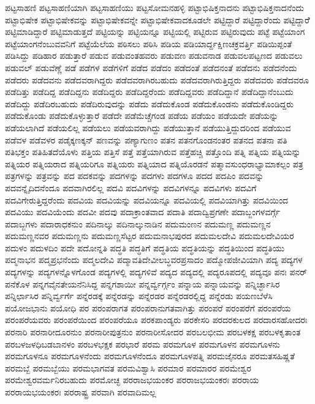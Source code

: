 {ಪಟ್ಟಸಾಹಣಿ
ಪಟ್ಟಸಾಹಣಿಯಾಗಿ
ಪಟ್ಟಸಾಹಣಿಯು
ಪಟ್ಟಸೋಮನಹಳ್ಳಿ
ಪಟ್ಟಾಭಿಷಿಕ್ತನಾದನು
ಪಟ್ಟಾಭಿಷಿಕ್ತನಾದನೆಂದು
ಪಟ್ಟಾಭಿಷೇಕ
ಪಟ್ಟಾಭಿಷೇಕವನ್ನು
ಪಟ್ಟಾಭಿಷೇಕವನ್ನೇ
ಪಟ್ಟಾಭಿಷೇಕವಾದಕೂಡಲೇ
ಪಟ್ಟಿದ್ದಾರೆ
ಪಟ್ಟಿದ್ದಾರೆಂದು
ಪಟ್ಟಿದ್ದಾರೆೆ
ಪಟ್ಟಿಮಾಡಿದ್ದಾರೆ
ಪಟ್ಟಿಮಾಡುತ್ತದೆ
ಪಟ್ಟಿಯನ್ನು
ಪಟ್ಟಿಯನ್ನೂ
ಪಟ್ಟಿಯಲ್ಲಿ
ಪಟ್ಟಿರುವ
ಪಟ್ಟಿರುವುದು
ಪಟ್ಟೆ
ಪಟ್ಟೆಯಾಂಗ
ಪಟ್ಟೆಯಾಂಗನೆಂಬುವವನಿಗೆ
ಪಟ್ಟೆಯೆಲೆಯ
ಪಠಿಸಲು
ಪಠಿಸಿ
ಪಡಿಯ
ಪಡಿಯಾರ್ದ್ದಕ್ಷಿಣಚಕ್ರವರ್ತ್ತಿ
ಪಡಿಯಿಪ್ಪಂತೆ
ಪಡಿಸಿದ್ದು
ಪಡಿಹಾರ
ಪಡುತ್ತಾರೆ
ಪಡುವ
ಪಡುವಂತಹವರು
ಪಡುವಣ
ಪಡುವನಾಡ
ಪಡುವಲಪಟ್ಟಣದ
ಪಡುವಲು
ಪಡುವಲ್
ಪಡುವೆಣ್ಣೆ
ಪಡೆ
ಪಡೆಗಳ
ಪಡೆಗಳಿಗೆ
ಪಡೆದ
ಪಡೆದಂ
ಪಡೆದಂತೆ
ಪಡೆದನಂತೆ
ಪಡೆದನು
ಪಡೆದನೆಂದು
ಪಡೆದರು
ಪಡೆದವನು
ಪಡೆದವರಾಗಿದ್ದರು
ಪಡೆದವರಾಗಿರಬಹುದು
ಪಡೆದವರಾಗಿರುತ್ತಿದ್ದರು
ಪಡೆದವರು
ಪಡೆದವರೂ
ಪಡೆದಿತ್ತು
ಪಡೆದಿದ್ದ
ಪಡೆದಿದ್ದನು
ಪಡೆದಿದ್ದರು
ಪಡೆದಿದ್ದರೆಂದು
ಪಡೆದಿದ್ದವರು
ಪಡೆದಿದ್ದಾನೆ
ಪಡೆದಿದ್ದಾನೆಂಬುದು
ಪಡೆದಿದ್ದು
ಪಡೆದಿರಬಹುದು
ಪಡೆದಿರುವುದನ್ನು
ಪಡೆದು
ಪಡೆದುಕೊಂಡ
ಪಡೆದುಕೊಂಡನು
ಪಡೆದುಕೊಂಡಿದ್ದರು
ಪಡೆದುಕೊಂಡು
ಪಡೆದುಕೊಳ್ಳುತ್ತಾರೆ
ಪಡೆದೇ
ಪಡೆಮೆಚ್ಚೆಗಂಡ
ಪಡೆಯ
ಪಡೆಯಂ
ಪಡೆಯದೇ
ಪಡೆಯನ್ನು
ಪಡೆಯಲಾಗಿದೆ
ಪಡೆಯಲಿಲ್ಲ
ಪಡೆಯಲು
ಪಡೆಯವರಾಗಿದ್ದು
ಪಡೆಯುತ್ತಾನೆ
ಪಡೆಯುತ್ತಿದ್ದುದರಿಂದ
ಪಡೆಯುವ
ಪಡೆವಳ
ಪಡೆವಳರ
ಪಡೈಕ್ಕಣಕ್ಕನ್
ಪಣವನ್ನು
ಪಣ್ಯಾಗುಣಂ
ಪತನ
ಪತನಗೊಂಡನಂತರ
ಪತನದ
ಪತನಾ
ಪತಿ
ಪತಿಭಕ್ತಂ
ಪತಿಹಿತದೆಯೊಳು
ಪತ್ತಿಯ
ಪತ್ತಿಸೆ
ಪತ್ತೆ
ಪತ್ತೆಯಾಗಿರುವ
ಪತ್ತೆಹಚ್ಚಿ
ಪತ್ತೊಂದಿ
ಪತ್ನಿ
ಪತ್ನಿಯ
ಪತ್ನಿಯನ್ನು
ಪತ್ನಿಯರ
ಪತ್ನಿಯರಾದ
ಪತ್ನಿಯರಿಗೂ
ಪತ್ನಿಯರು
ಪತ್ನಿಯಾದ
ಪತ್ನಿಯೊರಡನೆ
ಪತ್ಮಾವಸುಂಧರಾಭ್ಯಾಮಾಕಲ್ಪಂ
ಪತ್ರ
ಪತ್ರಗಳನ್ನು
ಪತ್ರವನ್ನು
ಪದ
ಪದಕವನ್ನು
ಪದಗಳನ್ನು
ಪದಗಳು
ಪದಗಳೂ
ಪದದ
ಪದಪಿಂ
ಪದವನ್ನು
ಪದವನ್ನೈದಿದನೆಂದೂ
ಪದವಾಗಿರಲಿಲ್ಲ
ಪದವಿ
ಪದವಿಗಳನ್ನು
ಪದವಿಗಳನ್ನೂ
ಪದವಿಗಳು
ಪದವಿಗೆ
ಪದವಿಗೇರುತ್ತಿದ್ದರೆಂದು
ಪದವಿಯ
ಪದವಿಯನ್ನು
ಪದವಿಯನ್ನೂ
ಪದವಿಯಲ್ಲಿ
ಪದವಿಯಾಗಿತ್ತು
ಪದವಿಯಿಂದ
ಪದವಿಯು
ಪದವಿಯೆಂದು
ಪದವೀ
ಪದವು
ಪದಾಕ್ರಾಂತವಾದ
ಪದಾತಿ
ಪದಾದ್ವಿಪ್ರಗಣೇ
ಪದಾಬ್ಜಂಗಳವರ್ಗ್ಗೆ
ಪದಾಬ್ಜಗಳು
ಪದಾರಾಧಕನುಂ
ಪದಿನಾಲ್ಕು
ಪದಿನಾಲ್ಕುನಾಡಿನ
ಪದುಮಂಣನ
ಪದುಮಣ್ಣ
ಪದುಮಣ್ಣನ
ಪದುಮಣ್ಣನವರ
ಪದುಮಣ್ಣನು
ಪದುಮಣ್ಣಸೆಟ್ಟರ
ಪದುಮನಾಭಪುರದ
ಪದುಮಲದೇವಿ
ಪದುಮಲದೇವಿಯರ
ಪದುಳಂ
ಪದುಳದಿಂ
ಪದೇ
ಪದೋನ್ನತಿ
ಪದ್ಧತಿ
ಪದ್ಧತಿಗೆ
ಪದ್ಧತಿಯ
ಪದ್ಧತಿಯನ್ನು
ಪದ್ಧತಿಯಿಂದ
ಪದ್ಧತಿಯು
ಪದ್ಮನಾಭನ
ಪದ್ಮಪ್ರಭನೆಂದು
ಪದ್ಮಲದೇವಿ
ಪದ್ಮಾವತಿದೇವೀಲಬ್ಧವರಪ್ರಸಾದಂ
ಪದ್ಮೋಪಜೀವಿಯಾಗಿ
ಪದ್ಯ
ಪದ್ಯಗಳ
ಪದ್ಯಗಳನ್ನು
ಪದ್ಯಗಳನ್ನೊಳಗೊಂಡ
ಪದ್ಯಗಳಲ್ಲಿ
ಪದ್ಯಗಳಿವೆ
ಪದ್ಯದ
ಪದ್ಯದಲ್ಲಿ
ಪದ್ಯರೂಪದಲ್ಲಿ
ಪದ್ಯವೂ
ಪನಃ
ಪನರ್
ಪನೆಕೊಳ
ಪನ್ನಗವೈನತೇಯನೆನಿಸಿದ್ದ
ಪನ್ನಗಶಾಯೀ
ಪನ್ನರ್ವ್ವರ್ಗ್ಗಂ
ಪನ್ನಾಯ
ಪನ್ನಾಯವನ್ನು
ಪನ್ನಿರ್ಚ್ಛಾಸಿರ
ಪನ್ನಿರ್ಛಾಸಿರ
ಪನ್ನಿರ್ವ್ವರ್ಗೆ
ಪನ್ನೆರಡಕ್ಕೆ
ಪನ್ನೆರಡನ್ನು
ಪನ್ನೆರಡರ
ಪನ್ನೆರಡರಲ್ಲಿದ್ದ
ಪನ್ನೆರಡು
ಪಯಣಬೆಳೆಸಿ
ಪಯೋಜಭಾನು
ಪಯೋಧಿ
ಪರ
ಪರಂಪರಾಗತ
ಪರಂಪರಾನುಗತವಾಗಿತ್ತು
ಪರಂಪರೆ
ಪರಂಪರೆಗೆ
ಪರಂಪರೆಯ
ಪರಂಪರೆಯವರು
ಪರಂಪರೆಯಿಂದ
ಪರಂಪರೆಯೂ
ಪರಕಪಾಂಡ್ಯರು
ಪರಕೇಸರಿ
ಪರದರಕುಲದ
ಪರದಾರಸಹೋದರಃ
ಪರನಾರಿ
ಪರನಾರೀದೂರನುಂ
ಪರನಾರೀಪುತ್ರನುಂ
ಪರನಾರೀಸೋದರ
ಪರಬಲಭೀಮ
ಪರಬಳಕಕ್ಷ
ಪರಬಳಕೃತಾಂತ
ಪರಬಳಜಳಧಿಬಡಬಾನಳಂ
ಪರಬಳಭಕ್ಷಕ
ಪರಭಾರೆ
ಪರಮ
ಪರಮಗೂಳ
ಪರಮಗೂಳನ
ಪರಮಗೂಳನು
ಪರಮಗೂಳನೂ
ಪರಮಗೂಳನೆಂದು
ಪರಮಗೂಳನೆಂದೂ
ಪರಮಗೂಳಪತ್ನಿ
ಪರಮಜೈನರೂ
ಪರಮತಸಹಿಷ್ಣತೆ
ಪರಮಬ್ಬೆ
ಪರಮಬ್ಬೆಯು
ಪರಮಭಾಗವತ
ಪರಮವಿಶ್ವಾಸಿ
ಪರಮಾರ
ಪರಮಾರರ
ಪರಮೇಶ್ವರ
ಪರಮೇಶ್ವರವರ್ಮನಿರಬಹುದು
ಪರಮೋಚ್ಛ
ಪರರಾಜಭಯಂಕರ
ಪರರಾಜಭಯಂಕರಃ
ಪರರಾಯ
ಪರರಾಯಭಯಂಕರಃ
ಪರರಾಷ್ಟ್ರ
ಪರವಾಗಿ
ಪರವಾದಿಮಲ್ಲ
}
